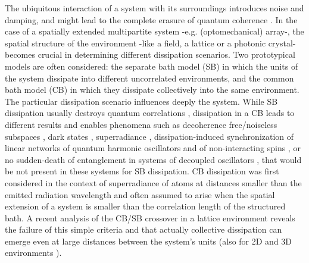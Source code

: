\documentclass[a4paper]{jpconf}
\begin{document}
The ubiquitous interaction of a system with its surroundings introduces noise 
and damping, and might lead to the complete erasure of quantum 
coherence \cite{26}. 
In the case of a spatially extended multipartite system -e.g. 
(optomechanical) array-, the spatial structure of the environment -like a field, a lattice or a 
photonic crystal- becomes crucial 
in determining different dissipation scenarios.
Two prototypical models are often considered: the separate 
bath model (SB) in which the units of the system dissipate into different 
uncorrelated environments, and the common bath model (CB) in which they 
dissipate collectively into the same environment. The particular dissipation 
scenario influences deeply the system. 
While SB dissipation usually destroys 
quantum correlations \cite{26},  dissipation in a CB leads to different results and enables phenomena such as 
decoherence free/noiseless subspaces \cite{27}, dark states \cite{zoller}, superradiance \cite{26,29}, dissipation-induced synchronization of linear networks of
quantum harmonic oscillators \cite{30,lalo} and of non-interacting spins \cite{extrasync5}, or no sudden-death of 
entanglement in systems of decoupled oscillators \cite{28,CB_ent}, that would be not present in these systems for SB dissipation. CB dissipation was 
first considered in the context of superradiance of atoms at distances smaller than the emitted 
radiation wavelength \cite{29} and 
often assumed to arise when the spatial extension of a system is smaller than the 
correlation length of the structured bath. A recent analysis of the CB/SB 
crossover in a lattice environment reveals the failure of this simple criteria and 
that actually collective dissipation can emerge 
even at large distances between the system's units (also for 2D and 3D environments \cite{31,CB_ent}). 
\end{document}
